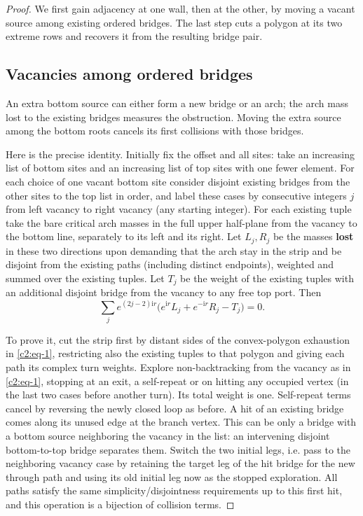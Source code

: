 \begin{proof}
We first gain adjacency at one wall, then at the other, by moving a vacant
source among existing ordered bridges. The last step cuts a polygon at
its two extreme rows and recovers it from the resulting bridge pair.

\subsection{Vacancies among ordered bridges}
An extra bottom source can either form a new bridge or an arch; the arch
mass lost to the existing bridges measures the obstruction. Moving the
extra source among the bottom roots cancels its first collisions with
those bridges.

Here is the precise identity. Initially fix the offset and all sites: take an increasing list of bottom sites and an increasing list of top sites with one fewer element. For each choice of one vacant bottom site consider disjoint existing bridges from the other sites to the top list in order, and label these cases by consecutive integers \(j\) from left vacancy to right vacancy (any starting integer). For each existing tuple take the bare critical arch masses in the full upper half-plane from the vacancy to the bottom line, separately to its left and its right. Let \(L_j,R_j\) be the masses \textbf{lost} in these two directions upon demanding that the arch stay in the strip and be disjoint from the existing paths (including distinct endpoints), weighted and summed over the existing tuples. Let \(T_j\) be the weight of the existing tuples with an additional disjoint bridge from the vacancy to any free top port. Then
\begin{equation}
 \sum_j e^{(2j-2)\mathrm i r}
       \big(e^{\mathrm i r} L_j+e^{-\mathrm i r}R_j-T_j\big)=0.              \label{c2:eq-B1}
\end{equation}

To prove it, cut the strip first by distant sides of the convex-polygon exhaustion in \eqref{c2:eq-1}, restricting also the existing tuples to that polygon and giving each path its complex turn weights. Explore non-backtracking from the vacancy as in \eqref{c2:eq-1}, stopping at an exit, a self-repeat or on hitting any occupied vertex (in the last two cases before another turn). Its total weight is one. Self-repeat terms cancel by reversing the newly closed loop as before. A hit of an existing bridge comes along its unused edge at the branch vertex. This can be only a bridge with a bottom source neighboring the vacancy in the list: an intervening disjoint bottom-to-top bridge separates them. Switch the two initial legs, i.e. pass to the neighboring vacancy case by retaining the target leg of the hit bridge for the new through path and using its old initial leg now as the stopped exploration. All paths satisfy the same simplicity/disjointness requirements up to this first hit, and this operation is a bijection of collision terms. 


\end{proof}
